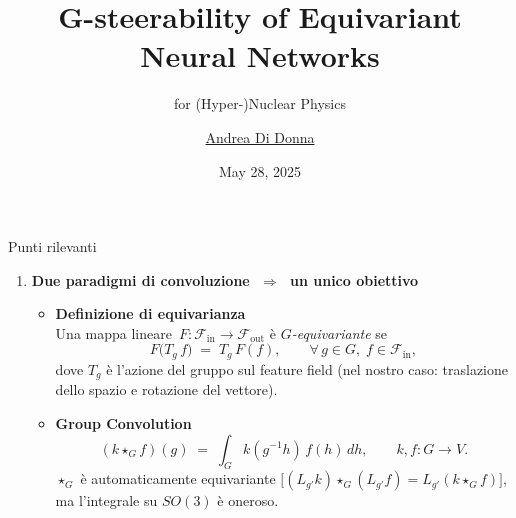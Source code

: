 \documentclass[aspectratio=32,8pt]{beamer}
\title{G-steerability of Equivariant Neural Networks}
\subtitle{for (Hyper-)Nuclear Physics}
\author{\href{mailto:andrea.didonna@unitn.it}{Andrea Di Donna}}
\date{May 28, 2025}
\begin{document}
\frame{\titlepage}


\begin{frame}{Punti rilevanti}
\tiny
\begin{enumerate}
\item \textbf{Due paradigmi di convoluzione \(\;\Rightarrow\;\) un unico obiettivo}

  \begin{itemize}\tiny
  \item \textbf{Definizione di equivarianza}\\[2pt]
        Una mappa lineare \(\,F\colon\!\mathcal F_{\text{in}}\!\to\!\mathcal F_{\text{out}}\)
        è \emph{\(G\)-equivariante} se
        \[
           F\bigl(T_g\,f\bigr) \;=\; T_g\,F(f),
           \qquad
           \forall\,g\in G,\;f\in\mathcal F_{\text{in}},
        \]
        dove \(T_g\) è l’azione del gruppo sul feature field
        (nel nostro caso: traslazione dello spazio e rotazione del vettore).
        \\[4pt]

  \item \textbf{Group Convolution}\\[2pt]
        \[
           (k\star_G f)(g)
           \;=\;
           \int_G k(g^{-1}h)\,f(h)\,dh,
           \qquad
           k,f : G \to V.
        \]
        \(\star_G\) è automaticamente equivariante \(\bigl[(L_{g'}k)\star_G(L_{g'}f)=L_{g'}(k\star_G f)\bigr]\),
        ma l’integrale su \(SO(3)\) è oneroso.
\end{itemize}
\end{enumerate}
\end{frame}
\end{document}
